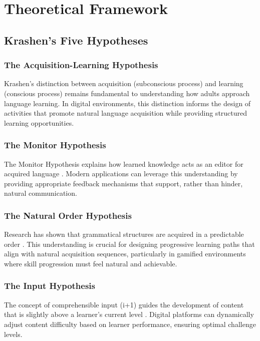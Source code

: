 \section{Theoretical Framework}
\subsection{Krashen's Five Hypotheses}
\subsubsection{The Acquisition-Learning Hypothesis}
Krashen's distinction between acquisition (subconscious process) and learning (conscious process) \citep{krashen2013second} remains fundamental to understanding how adults approach language learning. In digital environments, this distinction informs the design of activities that promote natural language acquisition while providing structured learning opportunities.

\subsubsection{The Monitor Hypothesis}
The Monitor Hypothesis explains how learned knowledge acts as an editor for acquired language \citep{krashen1982principles}. Modern applications can leverage this understanding by providing appropriate feedback mechanisms that support, rather than hinder, natural communication.

\subsubsection{The Natural Order Hypothesis}
Research has shown that grammatical structures are acquired in a predictable order \citep{dulay1974natural}. This understanding is crucial for designing progressive learning paths that align with natural acquisition sequences, particularly in gamified environments where skill progression must feel natural and achievable.

\subsubsection{The Input Hypothesis}
The concept of comprehensible input (i+1) guides the development of content that is slightly above a learner's current level \citep{krashen2013second}. Digital platforms can dynamically adjust content difficulty based on learner performance, ensuring optimal challenge levels.


